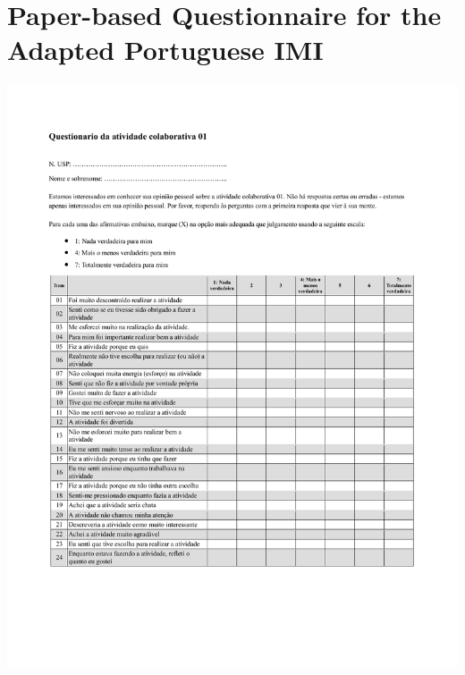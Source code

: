 \section[Paper-based Questionnaire for the Adapted Portuguese IMI]{Paper-based Questionnaire for the Adapted Portuguese IMI}
\label{annex:IMI-first-study}
\includegraphics[width=1\textwidth]{images/annex/IMI-first-study.pdf}

\newpage
